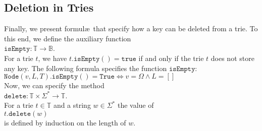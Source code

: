 \subsection{Deletion in Tries}
Finally, we present formul\ae\ that specify how a key can be deleted from a trie.
To this end, we define the auxiliary function
\\[0.2cm]
\hspace*{1.3cm} 
$\texttt{isEmpty}: \mathbb{T} \rightarrow \mathbb{B}$.
\\[0.2cm]
For a trie $t$, we have $t.\texttt{isEmpty}() = \texttt{true}$ if and only if the trie $t$ does not
store any key.  The following formula specifies the function $\texttt{isEmpty}$:
\\[0.2cm]
\hspace*{1.3cm}
$\texttt{Node}(v, L, T).\texttt{isEmpty}() = \mathtt{True} \Leftrightarrow v = \Omega \wedge L = []$
\\[0.2cm]
Now, we can specify the method
\\[0.2cm]
\hspace*{1.3cm}
$\texttt{delete}: \mathbb{T} \times \Sigma^* \rightarrow \mathbb{T}$.
\\[0.2cm]
For a trie  $t \in \mathbb{T}$ and a string $w \in \Sigma^*$ the value of
 \\[0.2cm]
\hspace*{1.3cm} 
$t.\texttt{delete}(w)$
\\[0.2cm]
is defined by induction on the length of  $w$.
